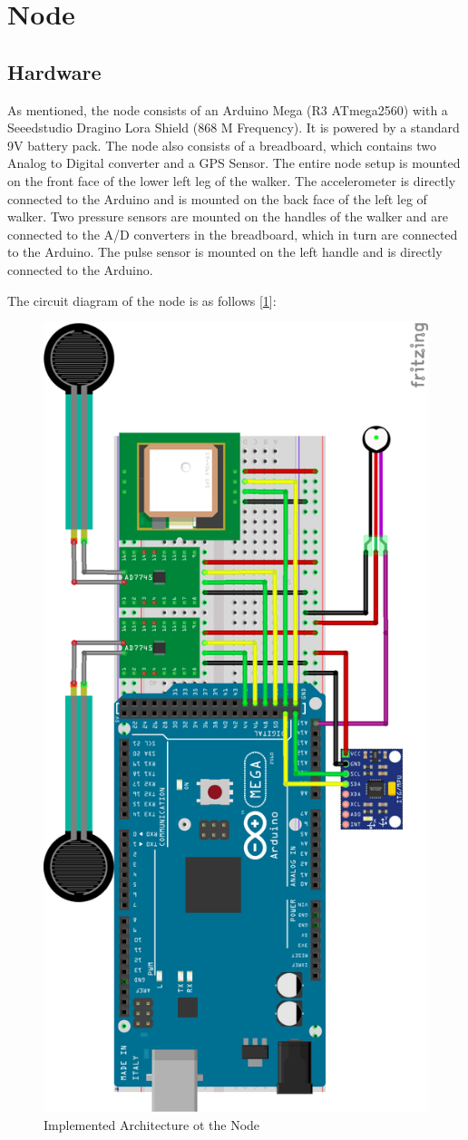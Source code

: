 \section{Node} 
	\subsection{Hardware}
		As mentioned, the node consists of an Arduino Mega (R3 ATmega2560) with a Seeedstudio Dragino Lora Shield (868 M Frequency). It is powered by a standard 9V battery pack. The node also consists of a breadboard, which contains two Analog to Digital converter and a GPS Sensor. The entire node setup is mounted on the front face of the lower left leg of the walker. The accelerometer is directly connected to the Arduino and is mounted on the back face of the left leg of walker. Two pressure sensors are mounted on the handles of the walker and are connected to the A/D converters in the breadboard, which in turn are connected to the Arduino. The pulse sensor is mounted on the left handle and is directly connected to the Arduino.

		The circuit diagram of the node is as follows [\ref{fig:architecture_node}]:

		\begin{figure}[h!]
			\centering
			\includegraphics[width=0.7\linewidth]{gfx/node_diagram}
			\caption{Implemented Architecture ot the Node}
			\label{fig:architecture_node}
		\end{figure}
		
